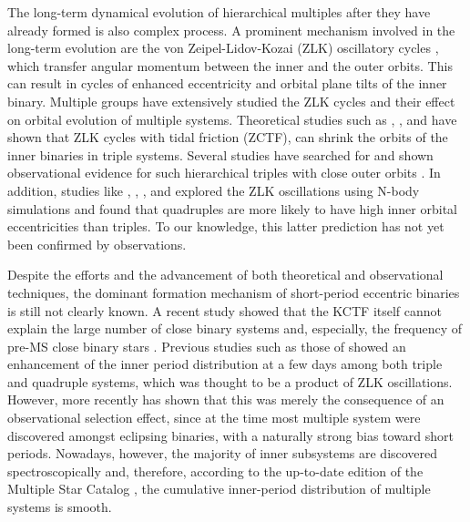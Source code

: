 \documentclass[fleqn,usenatbib]{mnras} %
\begin{document}
The long-term dynamical evolution of hierarchical multiples after they have already formed is also complex process. A prominent mechanism involved in the long-term evolution are the von Zeipel-Lidov-Kozai (ZLK) oscillatory cycles \citep[][]{vonZeipel1910, Lidov1962, Kozai1962}, which transfer angular momentum between the inner and the outer orbits. This can result in cycles of enhanced eccentricity and orbital plane tilts of the inner binary. Multiple groups have extensively studied the ZLK cycles and their effect on orbital evolution of multiple systems. Theoretical studies such as \citet[][]{Kiseleva1998}, \citet[][]{Fabrycky2007}, and \citet[][]{Naoz2014} have shown that ZLK cycles with tidal friction (ZCTF), can shrink the orbits of the inner binaries in triple systems. Several studies have searched for and shown observational evidence for such hierarchical triples with close outer orbits \citep[e.g.][]{Rappaport2013, Borkovits2016, Hajdu2017, Borkovits2020}. In addition, studies like \citet[][]{Pejcha2013}, \citet[][]{Hamers2015}, \citet[][]{Vokrouhlicky2016}, and \citet[][]{Hamers2017} explored the ZLK oscillations using N-body simulations and found that quadruples are more likely to have high inner orbital eccentricities than triples. To our knowledge, this latter prediction has not yet been confirmed by observations.

Despite the efforts and the advancement of both theoretical and observational techniques, the dominant formation mechanism of short-period eccentric binaries is still not clearly known. A recent study showed that the KCTF itself cannot explain the large number of close binary systems and, especially, the frequency of pre-MS close binary stars \citep[][]{Moe2018}. Previous studies such as those of \citet[][]{Tokovinin2008} showed an enhancement of the inner period distribution at a few days among both triple and quadruple systems, which was thought to be a product of ZLK oscillations. However, more recently \citet{Tokovinin2020} has shown that this was merely the consequence of an observational selection effect, since at the time most multiple system were discovered amongst eclipsing binaries, with a naturally strong bias toward short periods. Nowadays, however, the majority of inner subsystems are discovered spectroscopically and, therefore, according to the up-to-date edition of the Multiple Star Catalog \citep[MSC,][]{Tokovinin2018}, the cumulative inner-period distribution of multiple systems is smooth.
\end{document}
